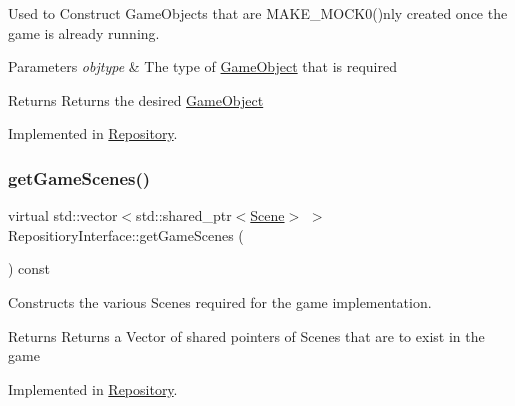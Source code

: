 Used to Construct Game\+Objects that are M\+A\+K\+E\+\_\+\+M\+O\+C\+K0()nly created once the game is already running. 


\begin{DoxyParams}{Parameters}
{\em objtype} & The type of \hyperlink{class_game_object}{Game\+Object} that is required \\
\hline
\end{DoxyParams}
\begin{DoxyReturn}{Returns}
Returns the desired \hyperlink{class_game_object}{Game\+Object} 
\end{DoxyReturn}


Implemented in \hyperlink{class_repository_ab239e9b04db0524e168d54201bcd7076}{Repository}.

\mbox{\label{class_repositiory_interface_a29a0f0fadd317082cb504bbb1161d50d}} 
\subsubsection{\texorpdfstring{get\+Game\+Scenes()}{getGameScenes()}}
{\footnotesize\ttfamily virtual std\+::vector$<$std\+::shared\+\_\+ptr$<$\hyperlink{class_scene}{Scene}$>$ $>$ Repositiory\+Interface\+::get\+Game\+Scenes (\begin{DoxyParamCaption}{ }\end{DoxyParamCaption}) const\hspace{0.3cm}{\ttfamily [pure virtual]}}



Constructs the various Scenes required for the game implementation. 

\begin{DoxyReturn}{Returns}
Returns a Vector of shared pointers of Scenes that are to exist in the game 
\end{DoxyReturn}


Implemented in \hyperlink{class_repository_ad49505f4ec3a15d0812ede7ff82b8be2}{Repository}.

\mbox{\label{class_repositiory_interface_a428e935faa2fd5790cbccc09f1066ef6}} 
